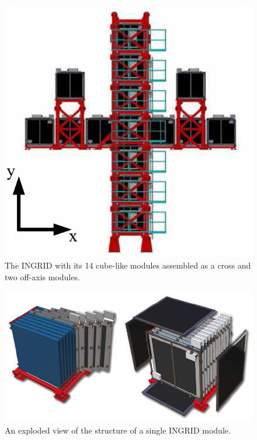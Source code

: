 \begin{figure}
\begin{center}
\includegraphics[width=6in]{./Figures/ingrid1.png}
\end{center}
\caption{The INGRID with its 14 cube-like modules assembled as a cross
  and two off-axis modules.}
\label{fig:ingrid1}
\end{figure}

\begin{figure}
\begin{center}
\includegraphics[width=6in]{./Figures/ingrid2.png}
\end{center}
\caption{An exploded view of the structure of a single INGRID module.}
\label{fig:ingrid2}
\end{figure}


